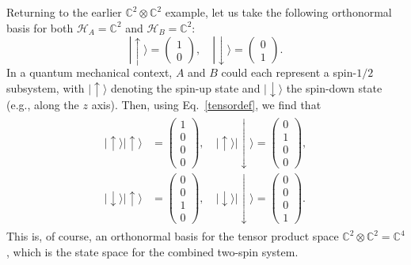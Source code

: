 \documentclass[pra,12pt]{revtex4-2}
\begin{document}
Returning to the earlier $\mathbb{C}^2\otimes\mathbb{C}^2$ example,
let us take the following orthonormal basis for both $\mathscr{H}_A =
\mathbb{C}^2$ and $\mathscr{H}_B = \mathbb{C}^2$:
\begin{equation}
  |\!\uparrow\rangle = \begin{pmatrix}1 \\ 0 \end{pmatrix}, \quad
  |\!\downarrow\rangle = \begin{pmatrix}0 \\ 1 \end{pmatrix}.
\end{equation}
In a quantum mechanical context, $A$ and $B$ could each represent a
spin-$1/2$ subsystem, with $|\!\uparrow\rangle$ denoting the spin-up
state and $|\!\downarrow\rangle$ the spin-down state (e.g., along the
$z$ axis).  Then, using Eq.~\eqref{tensordef}, we find that
\begin{align}
  \begin{aligned}
  |\!\uparrow\rangle  |\!\uparrow\rangle
  &= \begin{pmatrix}1 \\ 0 \\ 0 \\ 0\end{pmatrix},\quad
  |\!\uparrow\rangle  |\!\downarrow\rangle
  = \begin{pmatrix}0 \\ 1 \\ 0 \\ 0\end{pmatrix}, \\
  |\!\downarrow\rangle  |\!\uparrow\rangle
  &= \begin{pmatrix}0 \\ 0 \\ 1 \\ 0\end{pmatrix},\quad
  |\!\downarrow\rangle  |\!\downarrow\rangle
  = \begin{pmatrix}0 \\ 0 \\ 0 \\ 1\end{pmatrix}.
  \end{aligned}
\end{align}
This is, of course, an orthonormal basis for the tensor product space
$\mathbb{C}^2\otimes\mathbb{C}^2 = \mathbb{C}^4$, which is the state
space for the combined two-spin system.
\end{document}
